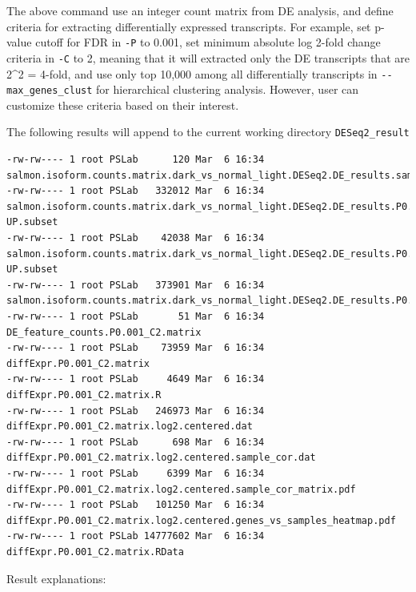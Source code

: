 \documentclass[
  letterpaper,
  DIV=11,
  numbers=noendperiod]{scrreprt}
\begin{document}
The above command use an integer count matrix from DE analysis, and
define criteria for extracting differentially expressed transcripts. For
example, set p-value cutoff for FDR in \texttt{-P} to 0.001, set minimum
absolute log 2-fold change criteria in \texttt{-C} to 2, meaning that it
will extracted only the DE transcripts that are 2\^{}2 = 4-fold, and use
only top 10,000 among all differentially transcripts in
\texttt{-\/-max\_genes\_clust} for hierarchical clustering analysis.
However, user can customize these criteria based on their interest.

The following results will append to the current working directory
\texttt{DESeq2\_result}

\begin{verbatim}
-rw-rw---- 1 root PSLab      120 Mar  6 16:34 salmon.isoform.counts.matrix.dark_vs_normal_light.DESeq2.DE_results.samples
-rw-rw---- 1 root PSLab   332012 Mar  6 16:34 salmon.isoform.counts.matrix.dark_vs_normal_light.DESeq2.DE_results.P0.001_C2.dark-UP.subset
-rw-rw---- 1 root PSLab    42038 Mar  6 16:34 salmon.isoform.counts.matrix.dark_vs_normal_light.DESeq2.DE_results.P0.001_C2.normal_light-UP.subset
-rw-rw---- 1 root PSLab   373901 Mar  6 16:34 salmon.isoform.counts.matrix.dark_vs_normal_light.DESeq2.DE_results.P0.001_C2.DE.subset
-rw-rw---- 1 root PSLab       51 Mar  6 16:34 DE_feature_counts.P0.001_C2.matrix
-rw-rw---- 1 root PSLab    73959 Mar  6 16:34 diffExpr.P0.001_C2.matrix
-rw-rw---- 1 root PSLab     4649 Mar  6 16:34 diffExpr.P0.001_C2.matrix.R
-rw-rw---- 1 root PSLab   246973 Mar  6 16:34 diffExpr.P0.001_C2.matrix.log2.centered.dat
-rw-rw---- 1 root PSLab      698 Mar  6 16:34 diffExpr.P0.001_C2.matrix.log2.centered.sample_cor.dat
-rw-rw---- 1 root PSLab     6399 Mar  6 16:34 diffExpr.P0.001_C2.matrix.log2.centered.sample_cor_matrix.pdf
-rw-rw---- 1 root PSLab   101250 Mar  6 16:34 diffExpr.P0.001_C2.matrix.log2.centered.genes_vs_samples_heatmap.pdf
-rw-rw---- 1 root PSLab 14777602 Mar  6 16:34 diffExpr.P0.001_C2.matrix.RData
\end{verbatim}

Result explanations:
\end{document}
